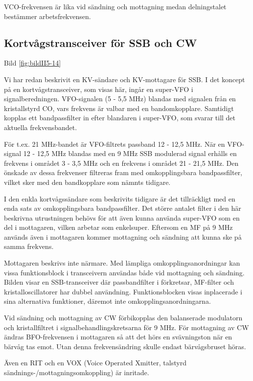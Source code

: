 VCO-frekvensen är lika vid sändning och mottagning medan delningstalet
bestämmer arbetsfrekvensen.

\subsection{Kortvågstransceiver för SSB och CW}

Bild \ref{fig:bildII5-14}

Vi har redan beskrivit en KV-sändare och KV-mottagare för SSB. I det
koncept på en kortvågstransceiver, som visas här, ingår en super-VFO i
signalberedningen. VFO-signalen (5 - 5,5 MHz) blandas med signalen
från en kristallstyrd CO, vars frekvens är valbar med en
bandomkopplare. Samtidigt kopplas ett bandpassfilter in efter
blandaren i super-VFO, som svarar till det aktuella frekvensbandet.

För t.ex. 21 MHz-bandet är VFO-filtrets passband 12 - 12,5 MHz. När en
VFO-signal 12 - 12,5 MHz blandas med en 9 MHz SSB modulerad signal
erhålls en frekvens i området 3 - 3,5 MHz och en frekvens i området
21 - 21,5 MHz. Den önskade av dessa frekvenser filtreras fram med
omkopplingsbara bandpassfilter, vilket sker med den bandkopplare som
nämnts tidigare.

I den enkla kortvågssändare som beskrivits tidigare är det
tillräckligt med en enda sats av omkopplingsbara bandpassfilter. Det
större antalet filter i den här beskrivna utrustningen behövs för att
även kunna använda super-VFO som en del i mottagaren, vilken arbetar
som enkelsuper. Eftersom en MF på 9 MHz används även i mottagaren
kommer mottagning och sändning att kunna ske på samma frekvens.

Mottagaren beskrivs inte närmare. Med lämpliga omkopplingsanordningar
kan vissa funktionsblock i transceivern användas både vid mottagning
och sändning. Bilden visar en SSB-transceiver där passbandfilter i
förkretsar, MF-filter och kristalloscillatorer har dubbel
användning. Funktionsblocken visas inplacerade i sina alternativa
funktioner, däremot inte omkopplingsanordningarna.

Vid sändning och mottagning av CW förbikopplas den balanserade
modulatorn och kristallfiltret i signalbehandlingskretsarna för 9
MHz. För mottagning av CW ändras BFO-frekvensen i mottagaren så att
det hörs en svävningston när en bärvåg tas emot. Utan denna
frekvensändring skulle endast bärvågsbruset höras.

Även en RIT och en VOX (Voice Operated Xmitter, talstyrd
sändnings-/mottagningsomkoppling) är inritade.

